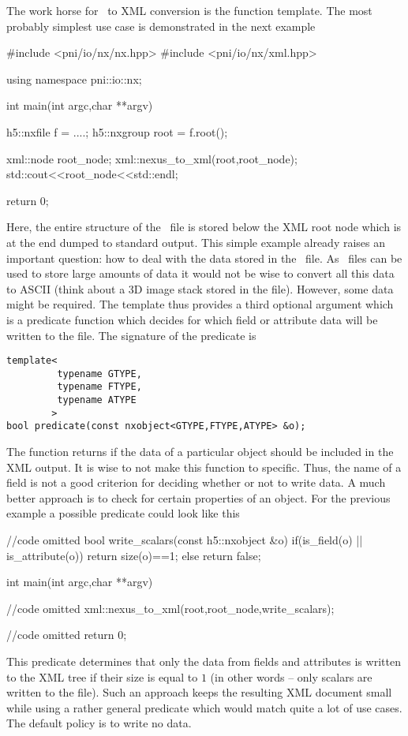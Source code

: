 {The work horse for \nexus\ to XML conversion is the  function
template. The most probably simplest use case is demonstrated in the next
example 
\begin{cppcode}
#include <pni/io/nx/nx.hpp>
#include <pni/io/nx/xml.hpp>

using namespace pni::io::nx;

int main(int argc,char **argv)
{
    h5::nxfile f = ....;
    h5::nxgroup root = f.root();

    xml::node root_node;
    xml::nexus_to_xml(root,root_node);
    std::cout<<root_node<<std::endl;

    return 0;
}
\end{cppcode}
Here, the entire structure of the \nexus\ file is stored below the XML root node 
which is at the end dumped to standard output.
This simple example already raises an important question: how to deal with the
data stored in the \nexus\ file. As \nexus\ files can be used to store large amounts
of data it would not be wise to convert all this data to ASCII (think about a 3D
image stack stored in the file). However, some data might be required. 
The  template thus provides a third optional argument which 
is a predicate function which decides for which field or attribute data will be
written to the file. 
The signature of the predicate is 
\begin{verbatim}
template<
         typename GTYPE,
         typename FTYPE,
         typename ATYPE
        >
bool predicate(const nxobject<GTYPE,FTYPE,ATYPE> &o);
\end{verbatim}
The function returns  if the data of a particular object should be 
included in the XML output. 
It is wise to not make this function to specific. Thus, the name of a field 
is not a good criterion for deciding whether or not to write data. 
A much better approach is to check for certain properties of an object. 
For the previous example a possible predicate could look like this
\begin{cppcode}
//code omitted 
bool write_scalars(const h5::nxobject &o)
{
    if(is_field(o) || is_attribute(o))
    {
       return size(o)==1;
    }
    else 
        return false;
}

int main(int argc,char **argv)
{
    //code omitted 
    xml::nexus_to_xml(root,root_node,write_scalars);

    //code omitted
    return 0;
}
\end{cppcode}
This predicate determines that only the data from fields and attributes 
is written to the XML tree if their size is equal to $1$ (in other words -- only
scalars are written to the file). 
Such an approach keeps the resulting XML document small while using a rather 
general predicate which would match quite a lot of use cases. The default 
policy is to write no data.


}
